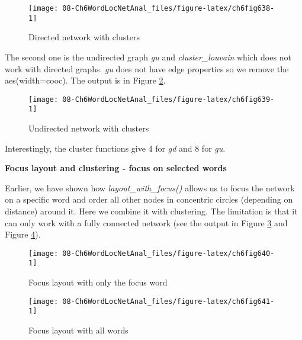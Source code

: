 \documentclass[
]{article}
\begin{document}
\begin{figure}

{\centering \texttt{[image: 08-Ch6WordLocNetAnal\_files/figure-latex/ch6fig638-1]} 

}

\caption{Directed network with clusters}\label{fig:ch6fig638}
\end{figure}

The second one is the undirected graph \emph{gu} and \emph{cluster\_louvain} which does not work with directed graphs. \emph{gu} does not have edge properties so we remove the aes(width=cooc). The output is in Figure \ref{fig:ch6fig639}.

\begin{figure}

{\centering \texttt{[image: 08-Ch6WordLocNetAnal\_files/figure-latex/ch6fig639-1]} 

}

\caption{Undirected network with clusters}\label{fig:ch6fig639}
\end{figure}

Interestingly, the cluster functions give 4 for \emph{gd} and 8 for \emph{gu}.

\textbf{Focus layout and clustering - focus on selected words}

Earlier, we have shown how \emph{layout\_with\_focus()} allows us to focus the network on a specific word and order all other nodes in concentric circles (depending on distance) around it. Here we combine it with clustering. The limitation is that it can only work with a fully connected network (see the output in Figure \ref{fig:ch6fig640} and Figure \ref{fig:ch6fig641}).

\begin{figure}

{\centering \texttt{[image: 08-Ch6WordLocNetAnal\_files/figure-latex/ch6fig640-1]} 

}

\caption{Focus layout with only the focus word}\label{fig:ch6fig640}
\end{figure}

\begin{figure}

{\centering \texttt{[image: 08-Ch6WordLocNetAnal\_files/figure-latex/ch6fig641-1]} 

}

\caption{Focus layout with all words}\label{fig:ch6fig641}
\end{figure}
\end{document}
